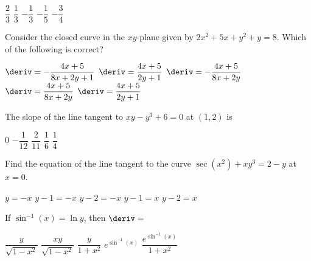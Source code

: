 \begin{questions}
    \begin{oneparchoices}
        \choice $\dfrac{2}{3}$
        \choice $\dfrac{1}{3}$
        \choice $-\dfrac{1}{3}$
        \choice $-\dfrac{1}{5}$
        \choice $-\dfrac{3}{4}$
    \end{oneparchoices} \par \horizontalline   

    \question Consider the closed curve in the $xy$-plane given by $2x^2 + 5x + y^2 + y = 8$. Which of the following is correct? \\

    \begin{oneparchoices}
        \choice $\deriv = -\dfrac{4x + 5}{8x + 2y + 1}$
        \choice $\deriv = \dfrac{4x + 5}{2y + 1}$
        \choice $\deriv = -\dfrac{4x + 5}{8x + 2y}$ \\[11pt]
        \makebox[0.21\textwidth] \choice $\deriv = \dfrac{4x + 5}{8x + 2y}$
        \makebox[0.25\textwidth] \choice $\deriv = \dfrac{4x + 5}{2y + 1}$
    \end{oneparchoices} \par \horizontalline

    \question The slope of the line tangent to $xy - y^3 + 6 = 0$ at $(1, 2)$ is \\

    \begin{oneparchoices}
        \choice $0$
        \choice $-\dfrac{1}{12}$
        \choice $\dfrac{2}{11}$
        \choice $\dfrac{1}{6}$
        \choice $\dfrac{1}{4}$
    \end{oneparchoices} \par \horizontalline

    \question Find the equation of the line tangent to the curve $\sec \left(x^2\right)+ xy^3 = 2 - y$ at $x = 0$. \\

    \begin{oneparchoices}
        \choice $y = -x$
        \choice $y - 1 = -x$
        \choice $y - 2 = -x$
        \choice $y - 1 = x$
        \choice $y - 2 = x$
    \end{oneparchoices} \par \horizontalline

    \question If $\sin^{-1} (x) = \ln y$, then $\deriv = $ \\

    \begin{oneparchoices}
        \choice $\dfrac{y}{\sqrt{1 - x^2}}$
        \choice $\dfrac{xy}{\sqrt{1 - x^2}}$
        \choice $\dfrac{y}{1 + x^2}$
        \choice $e^{\sin^{-1} (x)}$
        \choice $\dfrac{e^{\sin^{-1} (x)}}{1 + x^2}$
    \end{oneparchoices} \par \horizontalline


\end{questions}
